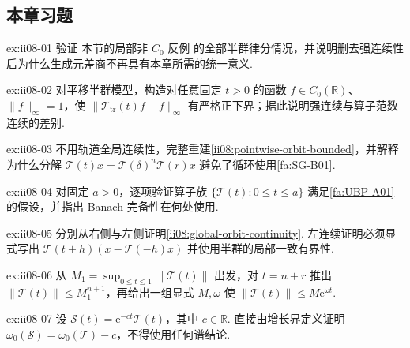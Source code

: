 \subsection*{本章习题}\label{sec:ii08-exercises}

\begin{FAExercise}{ex:ii08-01}
验证 本节的局部非 \(\displaystyle C_0\) 反例 的全部半群律分情况，并说明删去强连续性后为什么生成元差商不再具有本章所需的统一意义.
\end{FAExercise}

\begin{FAExercise}[强连续不推出算子范数连续]{ex:ii08-02}
对平移半群模型，构造对任意固定 \(\displaystyle t>0\) 的函数 \(\displaystyle f\in C_0(\mathbb R)\)、\(\displaystyle\|f\|_\infty=1\)，使 \(\displaystyle\|\mathcal T_{\mathrm{tr}}(t)f-f\|_\infty\) 有严格正下界；据此说明强连续与算子范数连续的差别.
\end{FAExercise}

\begin{FAExercise}[单轨道紧区间有界]{ex:ii08-03}
不用轨道全局连续性，完整重建\autoref{ii08:pointwise-orbit-bounded}，并解释为什么分解 \(\displaystyle\mathcal T(t)x=\mathcal T(\delta)^n\mathcal T(r)x\) 避免了循环使用\autoref{fa:SG-B01}.
\end{FAExercise}

\begin{FAExercise}[半群的局部一致有界性与一致有界性原理]{ex:ii08-04}
对固定 \(\displaystyle a>0\)，逐项验证算子族 \(\displaystyle\{\mathcal T(t):0\leqslant t\leqslant a\}\) 满足\autoref{fa:UBP-A01}的假设，并指出 Banach 完备性在何处使用.
\end{FAExercise}

\begin{FAExercise}[全部时间的轨道连续性]{ex:ii08-05}
分别从右侧与左侧证明\autoref{ii08:global-orbit-continuity}. 左连续证明必须显式写出 \(\displaystyle\mathcal T(t+h)(x-\mathcal T(-h)x)\) 并使用半群的局部一致有界性.
\end{FAExercise}

\begin{FAExercise}[指数增长估计]{ex:ii08-06}
从 \(\displaystyle M_1=\sup_{0\leqslant t\leqslant1}\|\mathcal T(t)\|\) 出发，对 \(\displaystyle t=n+r\) 推出 \(\displaystyle\|\mathcal T(t)\|\leqslant M_1^{n+1}\)，再给出一组显式 \(\displaystyle M,\omega\) 使 \(\displaystyle\|\mathcal T(t)\|\leqslant M\mathrm{e}^{\omega t}\).
\end{FAExercise}

\begin{FAExercise}[增长界的基本不变性]{ex:ii08-07}
设 \(\displaystyle\mathcal S(t)=\mathrm{e}^{-ct}\mathcal T(t)\)，其中 \(\displaystyle c\in\mathbb R\). 直接由增长界定义证明 \(\displaystyle\omega_0(\mathcal S)=\omega_0(\mathcal T)-c\)，不得使用任何谱结论.
\end{FAExercise}

